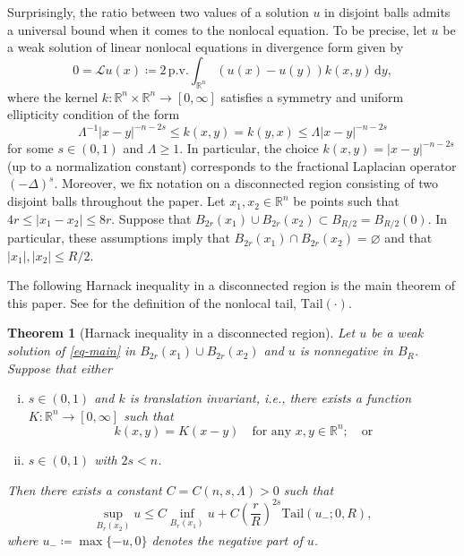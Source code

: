 \documentclass[11pt]{amsart}
\theoremstyle{plain}
\newtheorem{theorem}{Theorem}[section]
\theoremstyle{definition}
\numberwithin{equation}{section}
\begin{document}
Surprisingly, the ratio between two values of a solution $u$ in disjoint balls admits a universal bound when it comes to the nonlocal equation. To be precise, let $u$ be a weak solution of linear nonlocal equations in divergence form given by
\begin{equation}\label{eq-main}
        0=\mathcal{L}u(x)\coloneqq 2\,\mathrm{p.v.}\int_{\mathbb{R}^n} (u(x)-u(y))k(x, y)\,\mathrm{d}y,
\end{equation}
where the kernel $k :\mathbb{R}^n \times \mathbb{R}^n \to [0, \infty]$ satisfies a symmetry and uniform ellipticity condition of the form
\begin{equation*}
    \Lambda^{-1}|x-y|^{-n-2s} \leq k(x, y)=k(y, x) \leq \Lambda |x-y|^{-n-2s}
\end{equation*}
for some $s \in (0,1)$ and $\Lambda \geq 1$. In particular, the choice $k(x, y)=|x-y|^{-n-2s}$ (up to a normalization constant) corresponds to the fractional Laplacian operator $(-\Delta)^s$. Moreover, we fix notation on a disconnected region consisting of two disjoint balls throughout the paper. Let $x_1, x_2 \in \mathbb{R}^n$ be points such that $4r\leq |x_1-x_2| \leq 8r$. Suppose that $B_{2r}(x_1) \cup B_{2r}(x_2) \subset B_{R/2}=B_{R/2}(0)$. In particular, these assumptions imply that $B_{2r}(x_1) \cap B_{2r}(x_2)=\varnothing$ and that $|x_1|, |x_2| \leq R/2$.

The following Harnack inequality in a disconnected region is the main theorem of this paper. See  for the definition of the nonlocal tail, $\mathrm{Tail}(\cdot)$.
\begin{theorem}[Harnack inequality in a disconnected region]\label{thm-Harnack-disconnected}
    Let $u$ be a weak solution of \eqref{eq-main} in $B_{2r}(x_1) \cup B_{2r}(x_2)$ and $u$ is nonnegative in $B_R$. Suppose that either
    \begin{enumerate}[(i)]
        \item $s \in (0,1)$ and $k$ is translation invariant, i.e., there exists a function $K : \mathbb{R}^n \to [0, \infty]$ such that
        \begin{equation*}
            k(x, y)=K(x-y) \quad \text{for any $x, y \in \mathbb{R}^n$}; \quad \text{or}
        \end{equation*}
        
        \item $s \in (0, 1)$ with $2s<n$.
    \end{enumerate}    
    Then there exists a constant $C=C(n, s, \Lambda)>0$ such that
    \begin{equation*}
        \sup_{B_{r}(x_2)}u \leq C\inf_{B_r(x_1)}u+C\left(\frac{r}{R}\right)^{2s}\mathrm{Tail}(u_-; 0, R),
    \end{equation*}
    where $u_-\coloneqq\max\{-u, 0\}$ denotes the negative part of $u$.
\end{theorem}
\end{document}
